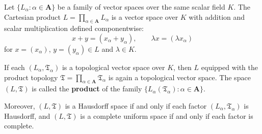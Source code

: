 Let $\{L_\alpha : \alpha \in \mathbf{A}\}$ be a family of vector spaces over the same scalar field $K$. The Cartesian product $L = \prod_{\alpha \in \mathbf{A}} L_\alpha$ is a vector space over $K$ with addition and scalar multiplication defined componentwise:
$$
x + y = (x_\alpha + y_\alpha), \qquad \lambda x = (\lambda x_\alpha)
$$
for $x = (x_\alpha)$, $y = (y_\alpha) \in L$ and $\lambda \in K$.

If each $(L_\alpha, \mathfrak{T}_\alpha)$ is a topological vector space over $K$, then $L$ equipped with the product topology $\mathfrak{T} = \prod_{\alpha \in \mathbf{A}} \mathfrak{T}_\alpha$ is again a topological vector space. The space $(L, \mathfrak{T})$ is called the \textbf{product} of the family $\{L_\alpha(\mathfrak{T}_\alpha) : \alpha \in \mathbf{A}\}$.

Moreover, $(L, \mathfrak{T})$ is a Hausdorff space if and only if each factor $(L_\alpha, \mathfrak{T}_\alpha)$ is Hausdorff, and $(L, \mathfrak{T})$ is a complete uniform space if and only if each factor is complete.
